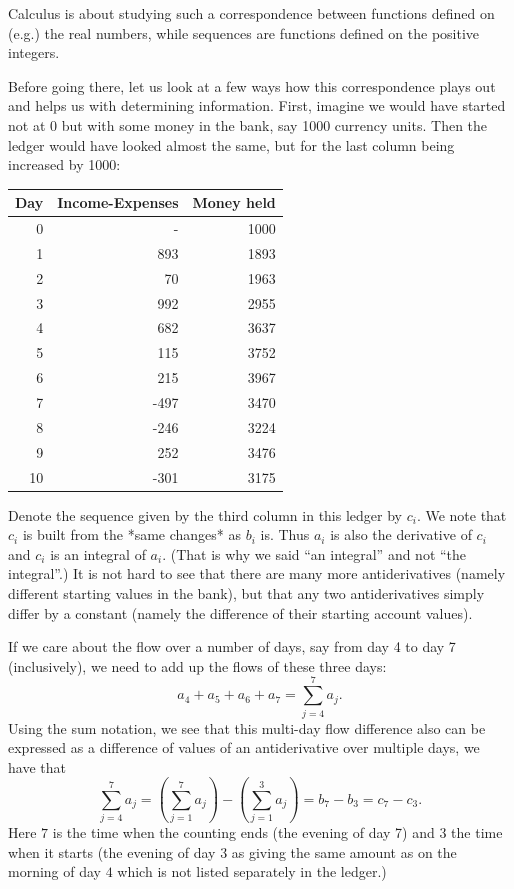 Calculus is about studying such a correspondence between functions defined on
(e.g.) the real numbers, while sequences are functions defined on the
positive integers.

Before going there, let us look at a few ways how this correspondence plays
out and helps us with determining information.
First, imagine we would have started not at 0 but with some money in the
bank, say 1000 currency units. Then the ledger would have looked almost the
same, but for the last column being increased by 1000:

\begin{center}
\begin{tabular}{rrr}
Day&Income-Expenses&Money held\\
\hline
0& - &1000\\
1&893&1893\\
2&70&1963\\
3&992&2955\\
4&682&3637\\
5&115&3752\\
6&215&3967\\
7&-497&3470\\
8&-246&3224\\
9&252&3476\\
10&-301&3175\\
\end{tabular}
\end{center}

Denote the sequence given by the third column in this ledger by $c_i$. We
note that $c_i$ is built from the *same changes* as $b_i$ is. Thus $a_i$ is
also the derivative of $c_i$ and $c_i$ is an integral of $a_i$. (That is why
we said ``an integral'' and not ``the integral''.) It is not hard to see that
there are many more antiderivatives (namely different starting values in the
bank), but that any two antiderivatives simply differ by a constant (namely
the difference of their starting account values).

If we care about the flow over a number of days, say from day 4 to day 7
(inclusively), we need to add up the flows of these three days:
$$a_4+a_5+a_6+a_7=\sum_{j=4}^7 a_j.$$
Using the sum notation, we see that this multi-day flow difference also can
be expressed as a difference of values of an antiderivative over multiple
days, we have that
$$\sum_{j=4}^7 a_j=(\sum_{j=1}^7 a_j)-(\sum_{j=1}^3 a_j)=b_7-b_3=c_7-c_3.$$
Here $7$ is the time when the counting ends (the evening of day 7) and $3$
the time when it starts (the evening of day $3$ as giving the same amount as
on the morning of day $4$ which is not listed separately in the ledger.)

